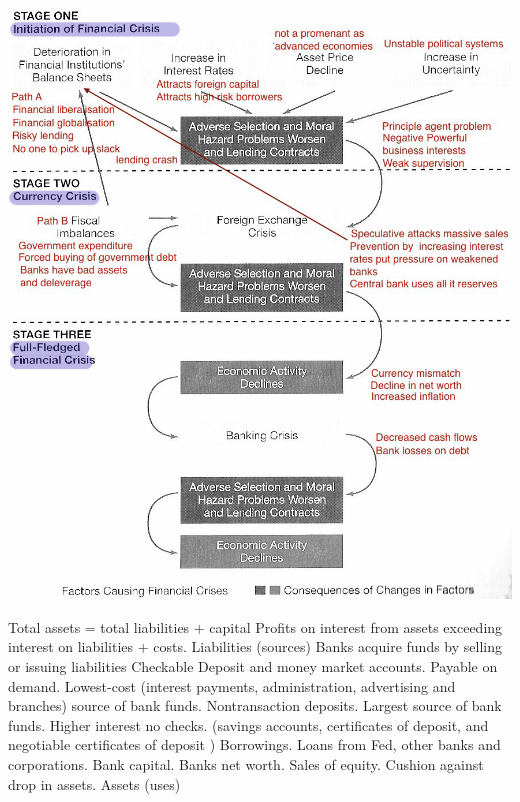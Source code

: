\documentclass[12pt]{examnotes}
\begin{document}
\includegraphics[scale=0.5]{./imgs/101.jpg}


\ra Total assets = total liabilities + capital
\ra Profits on interest from assets exceeding interest on liabilities + costs.
Liabilities (sources)
\ra Banks acquire funds by selling or issuing liabilities
 Checkable Deposit and money market accounts. Payable on demand. Lowest-cost (interest payments, administration, advertising and branches) source of bank funds.
 Nontransaction deposits. Largest source of bank funds. Higher interest no checks. (savings accounts, certificates of deposit,  and negotiable certificates of deposit )
 Borrowings. Loans from Fed, other banks and corporations.
 Bank capital. Banks net worth. Sales of equity. Cushion against drop in assets.
Assets (uses)

\ra 
\end{document}
